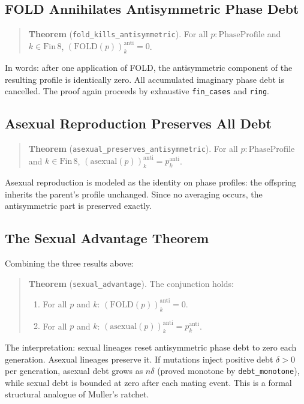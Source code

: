 \documentclass[11pt,twocolumn]{article}
\begin{document}
\subsection{FOLD Annihilates Antisymmetric Phase Debt}

\begin{quote}
\textbf{Theorem} (\texttt{fold\_kills\_antisymmetric}). For all
$p : \mathrm{PhaseProfile}$ and $k \in \mathrm{Fin}\,8$,
$(\mathrm{FOLD}(p))^{\mathrm{anti}}_k = 0$.
\end{quote}

In words: after one application of FOLD, the antisymmetric component of
the resulting profile is identically zero. All accumulated imaginary phase
debt is cancelled. The proof again proceeds by exhaustive
\texttt{fin\_cases} and \texttt{ring}.

\subsection{Asexual Reproduction Preserves All Debt}

\begin{quote}
\textbf{Theorem} (\texttt{asexual\_preserves\_antisymmetric}). For all
$p : \mathrm{PhaseProfile}$ and $k \in \mathrm{Fin}\,8$,
$(\mathrm{asexual}(p))^{\mathrm{anti}}_k = p^{\mathrm{anti}}_k$.
\end{quote}

Asexual reproduction is modeled as the identity on phase profiles: the
offspring inherits the parent's profile unchanged. Since no averaging
occurs, the antisymmetric part is preserved exactly.

\subsection{The Sexual Advantage Theorem}

Combining the three results above:

\begin{quote}
\textbf{Theorem} (\texttt{sexual\_advantage}). The conjunction holds:
\begin{enumerate}
\item For all $p$ and $k$:
  $(\mathrm{FOLD}(p))^{\mathrm{anti}}_k = 0$.
\item For all $p$ and $k$:
  $(\mathrm{asexual}(p))^{\mathrm{anti}}_k = p^{\mathrm{anti}}_k$.
\end{enumerate}
\end{quote}

The interpretation: sexual lineages reset antisymmetric phase debt to zero
each generation. Asexual lineages preserve it. If mutations inject
positive debt $\delta > 0$ per generation, asexual debt grows as
$n\delta$ (proved monotone by \texttt{debt\_monotone}), while sexual
debt is bounded at zero after each mating event. This is a formal
structural analogue of Muller's ratchet.
\end{document}
